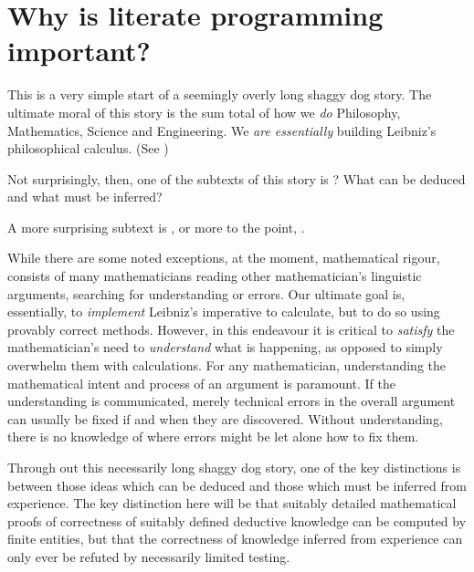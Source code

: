 
\startchapter[title=Overview] 

\section{Why is literate programming important?}

This is a very simple start of a seemingly overly long shaggy dog story. 
The ultimate moral of this story is the sum total of how we \emph{do} 
Philosophy, Mathematics, Science and Engineering. We \emph{are 
essentially} building Leibniz's philosophical calculus. (See ) 

Not surprisingly, then, one of the subtexts of this story is ? What can be deduced and what must be inferred? 

A more surprising subtext is , or more 
to the point, . 

While there are some noted exceptions, at the moment, mathematical rigour, 
consists of many mathematicians reading other mathematician's linguistic 
arguments, searching for understanding or errors. Our ultimate goal is, 
essentially, to \emph{implement} Leibniz's imperative to calculate, but to 
do so using provably correct methods. However, in this endeavour it is 
critical to \emph{satisfy} the mathematician's need to \emph{understand} 
what is happening, as opposed to simply overwhelm them with 
 calculations. For any mathematician, understanding the 
mathematical intent and process of an argument is paramount. If the 
understanding is communicated, merely technical errors in the overall 
argument can usually be fixed if and when they are discovered. Without 
understanding, there is no knowledge of where errors might be let alone 
how to fix them. 

Through out this necessarily long shaggy dog story, one of the key 
distinctions is between those ideas which can be deduced and those which 
must be inferred from experience. The key distinction here will be that 
suitably detailed mathematical proofs of correctness of suitably defined 
deductive knowledge can be computed by finite entities, but that the 
correctness of knowledge inferred from experience can only ever be refuted 
by necessarily limited testing. 

